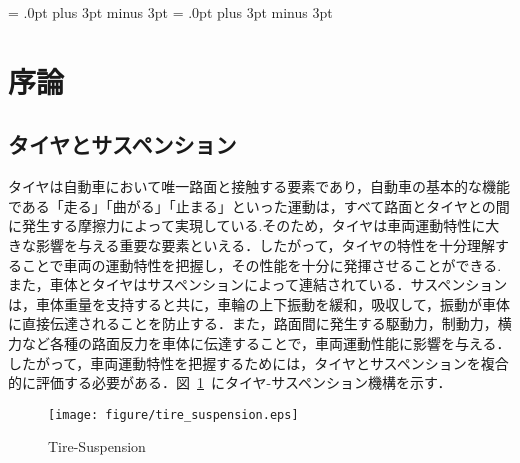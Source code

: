 \documentclass[a4paper,12pt]{article_vdlab_sotsuron}
\begin{document}
\kanjiskip = .0pt plus 3pt minus 3pt
\xkanjiskip = .0pt plus 3pt minus 3pt
\small
{}

\begin{center}
\end{center}

\tableofcontents

\newpage
\section{序論}
\subsection{タイヤとサスペンション}
タイヤは自動車において唯一路面と接触する要素であり，自動車の基本的な機能である「走る」「曲がる」「止まる」といった運動は，すべて路面とタイヤとの間に発生する摩擦力によって実現している\cite{1}.そのため，タイヤは車両運動特性に大きな影響を与える重要な要素といえる．したがって，タイヤの特性を十分理解することで車両の運動特性を把握し，その性能を十分に発揮させることができる\cite{2}.また，車体とタイヤはサスペンションによって連結されている．サスペンションは，車体重量を支持すると共に，車輪の上下振動を緩和，吸収して，振動が車体に直接伝達されることを防止する．また，路面間に発生する駆動力，制動力，横力など各種の路面反力を車体に伝達することで，車両運動性能に影響を与える．したがって，車両運動特性を把握するためには，タイヤとサスペンションを複合的に評価する必要がある．図~\ref{fig:tire_suspention}~にタイヤ-サスペンション機構を示す．

\vspace*{10mm}
\begin{figure}[h]
  \begin{center}
    \texttt{[image: figure/tire\_suspension.eps]}
    \vspace*{3mm}
    \caption{Tire-Suspension\cite{3}}
    \label{fig:tire_suspention}
  \end{center}
\end{figure}

\newpage
\end{document}
